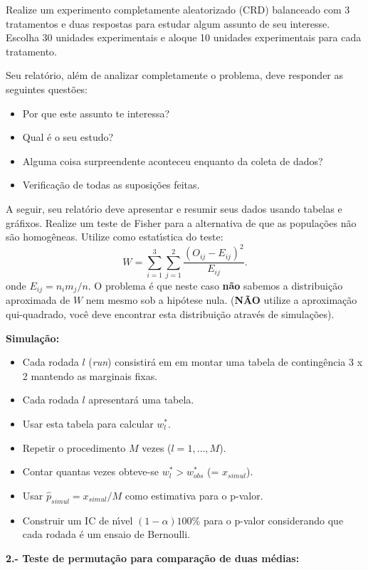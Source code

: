 \documentclass[12pt]{article}
\begin{document}
Realize um experimento completamente aleatorizado (CRD) balanceado
com 3 tratamentos e duas respostas para estudar algum assunto de seu interesse.
Escolha 30 unidades experimentais e aloque 10 unidades experimentais
para cada tratamento.

Seu relat\'orio, al\'{e}m de analizar completamente o problema,
deve responder as seguintes quest\~{o}es: 
\begin{itemize}
\item Por que este assunto te interessa?
\item Qual \'{e} o seu estudo?
\item Alguma coisa surpreendente aconteceu enquanto da coleta de
  dados?
\item Verifica\c{c}\~{a}o de todas as suposi\c{c}\~{o}es feitas.
\end{itemize}

A seguir, seu relat\'orio deve apresentar e resumir seus dados usando tabelas e gr\'afixos. Realize um teste de Fisher para a alternativa de que as popula\c c\~oes n\~ao s\~ao homog\^eneas.
Utilize como estat\'\i stica do teste:
$$ W = \sum_{i=1}^{3} \sum_{j=1}^2 \frac{(O_{ij} - E_{ij})^2}{E_{ij}}.$$
onde $E_{ij} = n_i m_j/n$.
O problema \'e que neste caso {\bf n\~ao} sabemos a distribui\c c\~ao aproximada de $W$
nem mesmo sob a hip\'otese nula. ({\bf N\~AO} utilize a aproxima\c c\~ao qui-quadrado,  voc\^e deve encontrar esta
distribui\c c\~ao atrav\'es de simula\c c\~oes).

{\bf Simula\c c\~ao:} 
\begin{itemize}
\item Cada rodada $l$ ({\it run}) consistir\'a em em montar uma tabela de conting\^encia
3 x 2 mantendo as marginais  fixas. 
\item Cada rodada $l$ apresentar\'a uma tabela. 
\item Usar esta tabela para calcular $w^*_{l}$.
\item Repetir o procedimento $M$ vezes ($l=1,\ldots,M$). 
\item Contar quantas vezes obteve-se  $w^*_{l} > w^*_{obs}$ (= $x_{simul}$). 
\item Usar $\hat{p}_{simul} = x_{simul}/M$ como estimativa para o p-valor.
\item Construir um IC de n\'\i vel $(1-\alpha)100$\% para o p-valor
  considerando que cada rodada \'e um ensaio de Bernoulli.
\end{itemize}

{\bf 2.- Teste de permuta\c c\~ao para compara\c c\~ao de duas m\'edias:} 
\end{document}
